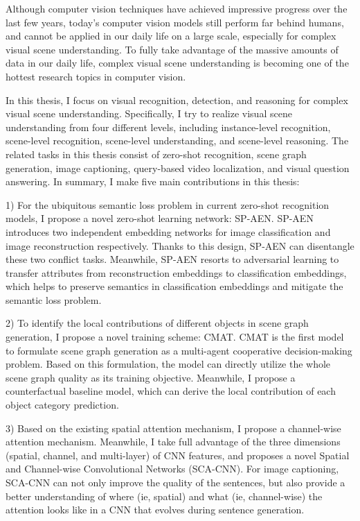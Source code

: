 \begin{englishabstract}

Although computer vision techniques have achieved impressive progress over the last few years, today's computer vision models still perform far behind humans, and cannot be applied in our daily life on a large scale, especially for complex visual scene understanding. To fully take advantage of the massive amounts of data in our daily life, complex visual scene understanding is becoming one of the hottest research topics in computer vision.

In this thesis, I focus on visual recognition, detection, and reasoning for complex visual scene understanding. Specifically, I try to realize visual scene understanding from four different levels, including instance-level recognition, scene-level recognition, scene-level understanding, and scene-level reasoning. The related tasks in this thesis consist of zero-shot recognition, scene graph generation, image captioning, query-based video localization, and visual question answering. In summary, I make five main contributions in this thesis:

1) For the ubiquitous semantic loss problem in current zero-shot recognition models, I propose a novel zero-shot learning network: SP-AEN. SP-AEN introduces two independent embedding networks for image classification and image reconstruction respectively. Thanks to this design, SP-AEN can disentangle these two conflict tasks. Meanwhile, SP-AEN resorts to adversarial learning to transfer attributes from reconstruction embeddings to classification embeddings, which helps to preserve semantics in classification embeddings and mitigate the semantic loss problem.

2) To identify the local contributions of different objects in scene graph generation, I propose a novel training scheme: CMAT. CMAT is the first model to formulate scene graph generation as a multi-agent cooperative decision-making problem. Based on this formulation, the model can directly utilize the whole scene graph quality as its training objective. Meanwhile, I propose a counterfactual baseline model, which can derive the local contribution of each object category prediction.

3) Based on the existing spatial attention mechanism, I propose a channel-wise attention mechanism. Meanwhile, I take full advantage of the three dimensions (spatial, channel, and multi-layer) of CNN features, and proposes a novel Spatial and Channel-wise Convolutional Networks (SCA-CNN). For image captioning, SCA-CNN can not only improve the quality of the sentences, but also provide a better understanding of where (ie, spatial) and what (ie, channel-wise) the attention looks like in a CNN that evolves during sentence generation.


\end{englishabstract}
